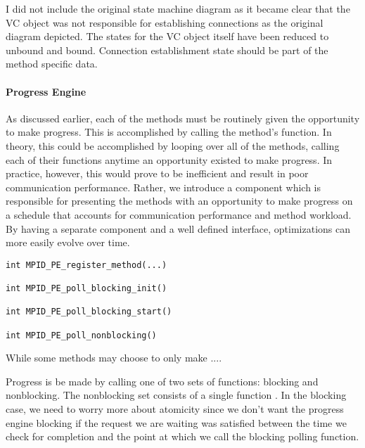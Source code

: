\begin{cmt}[BRT]
  I did not include the original state machine diagram as it became clear that
  the VC object was not responsible for establishing connections as the
  original diagram depicted.  The states for the VC object itself have been
  reduced to unbound and bound.  Connection establishment state should be part
  of the method specific data.
\end{cmt}

\paragraph{Progress Engine}


As discussed earlier, each of the methods must be routinely given the
opportunity to make progress.  This is accomplished by calling the method's
 function.  In theory, this could be accomplished by looping over
all of the methods, calling each of their  functions anytime an
opportunity existed to make progress.  In practice, however, this would prove
to be inefficient and result in poor communication performance.  Rather, we
introduce a  component which is responsible for
presenting the methods with an opportunity to make progress on a schedule
that accounts for communication performance and method workload.  By having a
separate component and a well defined interface, optimizations can more
easily evolve over time.

\begin{verbatim}
int MPID_PE_register_method(...)

int MPID_PE_poll_blocking_init()

int MPID_PE_poll_blocking_start()

int MPID_PE_poll_nonblocking()
\end{verbatim}


While some methods may choose to only make ....

Progress is be made by calling one of two sets of functions: blocking and
nonblocking.  The nonblocking set consists of a single function
.  In the blocking case, we need to worry more
about atomicity since we don't want the progress engine blocking if the
request we are waiting was satisfied between the time we check for completion
and the point at which we call the
blocking polling function.  

